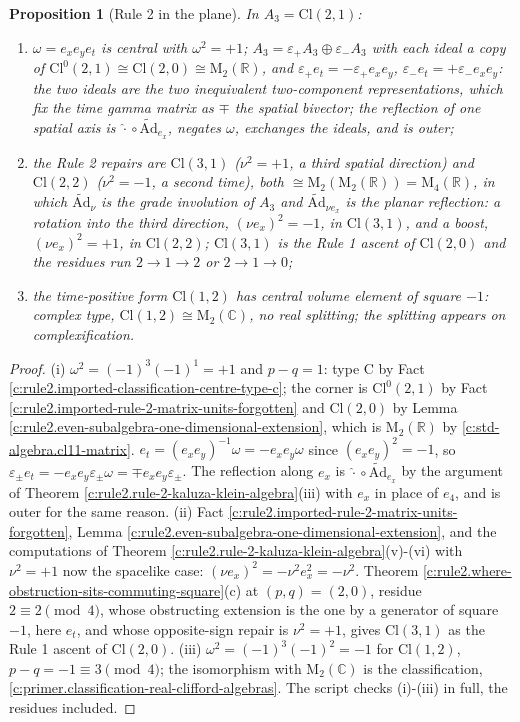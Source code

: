 \documentclass[11pt]{article}
\newtheorem{proposition}[theorem]{Proposition}
\theoremstyle{definition}
\theoremstyle{plain}
\providecommand{\Ad}{}\renewcommand{\Ad}{\widetilde{\mathrm{Ad}}}
\providecommand{\C}{}\renewcommand{\C}{\mathbb{C}}
\providecommand{\Cl}{}\renewcommand{\Cl}{\mathrm{Cl}}
\providecommand{\Mat}{}\renewcommand{\Mat}{\mathrm{M}}
\providecommand{\R}{}\renewcommand{\R}{\mathbb{R}}
\begin{document}
\begin{proposition}[Rule 2 in the plane]\label{c:rule2.rule-2-plane}
In $A_3 = \Cl(2,1)$:
\begin{enumerate}
\item[(i)] $\omega = e_xe_ye_t$ is central with $\omega^2 = +1$; $A_3 = \varepsilon_+ A_3 \oplus \varepsilon_- A_3$ with each ideal a copy of $\Cl^0(2,1) \cong \Cl(2,0) \cong \Mat_2(\R)$, and $\varepsilon_+ e_t = -\varepsilon_+ e_xe_y$, $\varepsilon_- e_t = +\varepsilon_- e_xe_y$: the two ideals are the two inequivalent two-component representations, which fix the time gamma matrix as $\mp$ the spatial bivector; the reflection of one spatial axis is $\hat{\cdot}\circ\Ad_{e_x}$, negates $\omega$, exchanges the ideals, and is outer;
\item[(ii)] the Rule 2 repairs are $\Cl(3,1)$ ($\nu^2 = +1$, a third spatial direction) and $\Cl(2,2)$ ($\nu^2 = -1$, a second time), both $\cong \Mat_2(\Mat_2(\R)) = \Mat_4(\R)$, in which $\Ad_\nu$ is the grade involution of $A_3$ and $\Ad_{\nu e_x}$ is the planar reflection: a rotation into the third direction, $(\nu e_x)^2 = -1$, in $\Cl(3,1)$, and a boost, $(\nu e_x)^2 = +1$, in $\Cl(2,2)$; $\Cl(3,1)$ is the Rule 1 ascent of $\Cl(2,0)$ and the residues run $2 \to 1 \to 2$ or $2 \to 1 \to 0$;
\item[(iii)] the time-positive form $\Cl(1,2)$ has central volume element of square $-1$: complex type, $\Cl(1,2) \cong \Mat_2(\C)$, no real splitting; the splitting appears on complexification.
\end{enumerate}
\end{proposition}
\begin{proof}
(i) $\omega^2 = (-1)^3(-1)^1 = +1$ and $p - q = 1$: type C by Fact \ref{c:rule2.imported-classification-centre-type-c}; the corner is $\Cl^0(2,1)$ by Fact \ref{c:rule2.imported-rule-2-matrix-units-forgotten} and $\Cl(2,0)$ by Lemma \ref{c:rule2.even-subalgebra-one-dimensional-extension}, which is $\Mat_2(\R)$ by \ref{c:std-algebra.cl11-matrix}. $e_t = (e_xe_y)^{-1}\omega = -e_xe_y\omega$ since $(e_xe_y)^2 = -1$, so $\varepsilon_\pm e_t = -e_xe_y\varepsilon_\pm\omega = \mp e_xe_y\varepsilon_\pm$. The reflection along $e_x$ is $\hat{\cdot}\circ\Ad_{e_x}$ by the argument of Theorem \ref{c:rule2.rule-2-kaluza-klein-algebra}(iii) with $e_x$ in place of $e_4$, and is outer for the same reason. (ii) Fact \ref{c:rule2.imported-rule-2-matrix-units-forgotten}, Lemma \ref{c:rule2.even-subalgebra-one-dimensional-extension}, and the computations of Theorem \ref{c:rule2.rule-2-kaluza-klein-algebra}(v)-(vi) with $\nu^2 = +1$ now the spacelike case: $(\nu e_x)^2 = -\nu^2e_x^2 = -\nu^2$. Theorem \ref{c:rule2.where-obstruction-sits-commuting-square}(c) at $(p,q) = (2,0)$, residue $2 \equiv 2 \pmod 4$, whose obstructing extension is the one by a generator of square $-1$, here $e_t$, and whose opposite-sign repair is $\nu^2 = +1$, gives $\Cl(3,1)$ as the Rule 1 ascent of $\Cl(2,0)$. (iii) $\omega^2 = (-1)^3(-1)^2 = -1$ for $\Cl(1,2)$, $p - q = -1 \equiv 3 \pmod 4$; the isomorphism with $\Mat_2(\C)$ is the classification, \ref{c:primer.classification-real-clifford-algebras}. The script checks (i)-(iii) in full, the residues included.

\end{proof}
\end{document}
